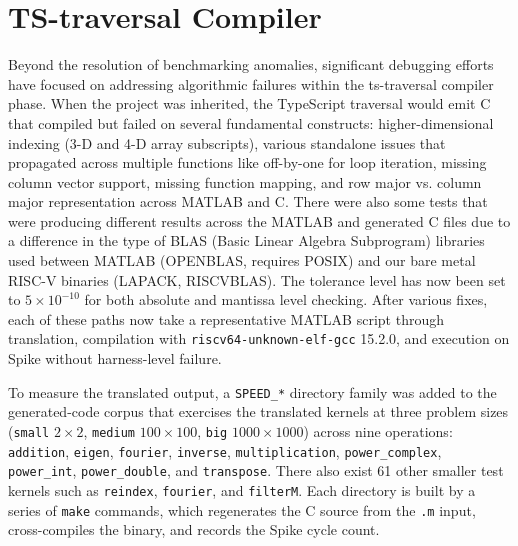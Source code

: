 \section{TS-traversal Compiler}

Beyond the resolution of benchmarking anomalies, significant debugging efforts have focused on addressing algorithmic failures within the ts-traversal compiler phase. When the project was inherited, the TypeScript traversal would emit C that compiled but failed on several fundamental constructs: higher-dimensional indexing (3-D and 4-D array subscripts), various standalone issues that propagated across multiple functions like off-by-one for loop iteration, missing column vector support, missing function mapping, and row major vs. column major representation across MATLAB and C. There were also some tests that were producing different results across the MATLAB and generated C files due to a difference in the type of BLAS (Basic Linear Algebra Subprogram) libraries used between MATLAB (OPENBLAS, requires POSIX) and our bare metal RISC-V binaries (LAPACK, RISCVBLAS). The tolerance level has now been set to $5 \times 10^{-10}$ for both absolute and mantissa level checking. After various fixes, each of these paths now take a representative MATLAB script through translation, compilation with \texttt{riscv64-unknown-elf-gcc} 15.2.0, and execution on Spike without harness-level failure.

To measure the translated output, a \texttt{SPEED\_*} directory family was added to the generated-code corpus that exercises the translated kernels at three problem sizes (\texttt{small} $2 \times 2$, \texttt{medium} $100 \times 100$, \texttt{big} $1000 \times 1000$) across nine operations: \texttt{addition}, \texttt{eigen}, \texttt{fourier}, \texttt{inverse}, \texttt{multiplication}, \texttt{power\_complex}, \texttt{power\_int}, \texttt{power\_double}, and \texttt{transpose}. There also exist 61 other smaller test kernels such as \texttt{reindex}, \texttt{fourier}, and \texttt{filterM}.  Each directory is built by a series of \texttt{make} commands, which regenerates the C source from the \texttt{.m} input, cross-compiles the binary, and records the Spike cycle count.

